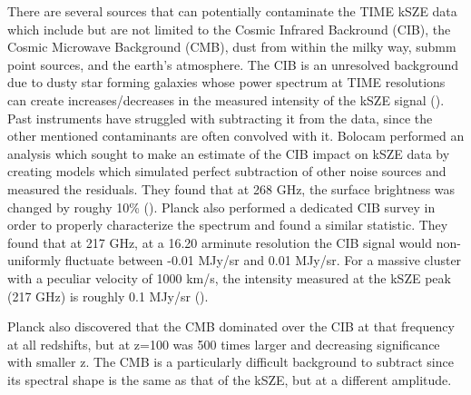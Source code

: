 \documentclass[manuscript]{aastex}
\begin{document}
There are several sources that can potentially contaminate the TIME kSZE data which include but are not limited to the Cosmic Infrared Backround (CIB), the Cosmic Microwave Background (CMB), dust from within the milky way, submm point sources, and the earth's atmosphere. The CIB is an unresolved background due to dusty star forming galaxies whose power spectrum at TIME resolutions can create increases/decreases in the measured intensity of the kSZE signal (\cite{Planck2016b}). Past instruments have struggled with subtracting it from the data, since the other mentioned contaminants are often convolved with it. Bolocam performed an analysis which sought to make an estimate of the CIB impact on kSZE data by creating models which simulated perfect subtraction of other noise sources and measured the residuals. They found that at 268 GHz, the surface brightness was changed by roughy 10\% (\cite{Sayers2013}). Planck also performed a dedicated CIB survey in order to properly characterize the spectrum and found a similar statistic. They found that at 217 GHz, at a 16.20 arminute resolution the CIB signal would non-uniformly fluctuate between -0.01 MJy/sr and 0.01 MJy/sr. For a massive cluster with a peculiar velocity of 1000 km/s, the intensity measured at the kSZE peak (217 GHz) is roughly 0.1 MJy/sr (\cite{Planck2014}). 

Planck also discovered that the CMB dominated over the CIB at that frequency at all redshifts, but at z=100 was 500 times larger and decreasing significance with smaller z. The CMB is a particularly difficult background to subtract since its spectral shape is the same as that of the kSZE, but at a different amplitude. 


\end{document}
